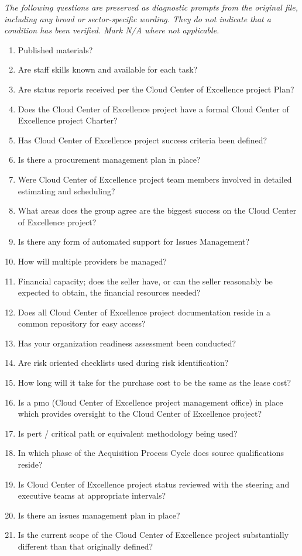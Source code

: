 \documentclass[10pt,letterpaper]{article}
\newcommand{\docsection}[1]{\par\Needspace{5\baselineskip}\vspace{8pt}{\large\sffamily\bfseries\color{navy}#1}\par\vspace{2pt}{\color{rulegrey}\rule{\linewidth}{.6pt}}\par}
\begin{document}
\docsection{03 \quad Source diagnostic checklist}
\textit{The following questions are preserved as diagnostic prompts from the original file, including any broad or sector-specific wording. They do not indicate that a condition has been verified. Mark N/A where not applicable.}
\begingroup\small\begin{enumerate}[leftmargin=2.1em, itemsep=4pt]
\item[1.] Published materials?
\item[2.] Are staff skills known and available for each task?
\item[3.] Are status reports received per the Cloud Center of Excellence project Plan?
\item[4.] Does the Cloud Center of Excellence project have a formal Cloud Center of Excellence project Charter?
\item[5.] Has Cloud Center of Excellence project success criteria been defined?
\item[6.] Is there a procurement management plan in place?
\item[7.] Were Cloud Center of Excellence project team members involved in detailed estimating and scheduling?
\item[8.] What areas does the group agree are the biggest success on the Cloud Center of Excellence project?
\item[9.] Is there any form of automated support for Issues Management?
\item[10.] How will multiple providers be managed?
\item[11.] Financial capacity; does the seller have, or can the seller reasonably be expected to obtain, the financial resources needed?
\item[12.] Does all Cloud Center of Excellence project documentation reside in a common repository for easy access?
\item[13.] Has your organization readiness assessment been conducted?
\item[14.] Are risk oriented checklists used during risk identification?
\item[15.] How long will it take for the purchase cost to be the same as the lease cost?
\item[16.] Is a pmo (Cloud Center of Excellence project management office) in place which provides oversight to the Cloud Center of Excellence project?
\item[17.] Is pert / critical path or equivalent methodology being used?
\item[18.] In which phase of the Acquisition Process Cycle does source qualifications reside?
\item[19.] Is Cloud Center of Excellence project status reviewed with the steering and executive teams at appropriate intervals?
\item[20.] Is there an issues management plan in place?
\item[21.] Is the current scope of the Cloud Center of Excellence project substantially different than that originally defined?
\end{enumerate}\endgroup
\end{document}
